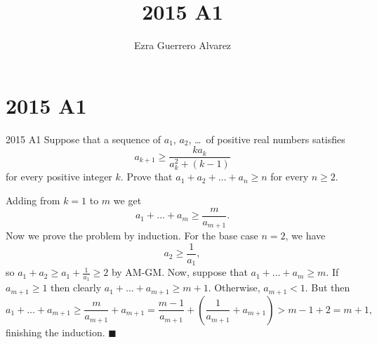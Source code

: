 \documentclass[14pt]{article}
\title{2015 A1}
\author{Ezra Guerrero Alvarez}
\begin{document}
\maketitle
	
\section*{2015 A1}

\begin{statement}{2015 A1}
	Suppose that a sequence of $a_1$, $a_2$, \dots\ of positive real numbers satisfies
	\[ a_{k+1} \ge \frac{ka_k}{a_k^2 + (k-1)} \]
	for every positive integer $k$.
	Prove that $a_1 + a_2 + \dots + a_n \ge n$ for every $n \ge 2$.
\end{statement}
Adding from $k=1$ to $m$ we get
\[ a_1+\ldots+a_m\ge\frac m{a_{m+1}}. \]
Now we prove the problem by induction. For the base case $n=2$, we have
\[ a_2\ge\frac1{a_1}, \]
so $a_1+a_2\ge a_1+\frac1{a_1}\ge2$ by AM-GM. Now, suppose that $a_1+\ldots+a_m\ge m$. If $a_{m+1}\ge1$ then clearly $a_1+\ldots+a_{m+1}\ge m+1$. Otherwise, $a_{m+1}<1$. But then
\[ a_1+\ldots+a_{m+1}\ge\frac m{a_{m+1}}+a_{m+1}=\frac{m-1}{a_{m+1}}+\left(\frac1{a_{m+1}}+a_{m+1}\right)>m-1+2=m+1, \]
finishing the induction. $\blacksquare$
	
\end{document}
